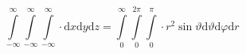 \documentclass[14pt]{article}
\begin{document}
\pagestyle{empty}
\[ \int\limits_{-\infty}^{\infty} \int\limits_{-\infty}^{\infty} \int\limits_{-\infty}^{\infty} \cdot \mathrm dx \mathrm dy \mathrm dz = 
   \int\limits_{0}^{\infty} \int\limits_{0}^{2\pi} \int\limits_{0}^{\pi} \cdot r^2 \sin \vartheta \mathrm d\vartheta \mathrm d\varphi \mathrm dr \]
\end{document}
